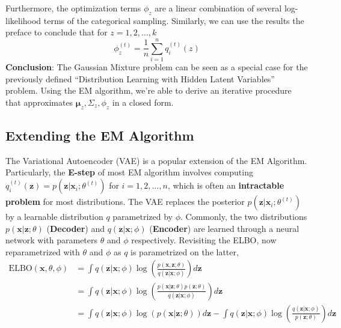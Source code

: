 Furthermore, the optimization terms $\phi_z$ are a linear combination of several log-likelihood terms of the categorical sampling. Similarly, we can use the results the preface to conclude that for $z=1,2,\dots,k$
\[
\phi_z^{(t)}  = \frac{1}{n} \sum_{i=1}^n q_i^{(t)}(z)
\]
\textbf{Conclusion}: The Gaussian Mixture problem can be seen as a special case for the previously defined ``Distribution Learning with Hidden Latent Variables'' problem. Using the EM algorithm, we're able to derive an iterative procedure that approximates $\boldsymbol{\mu}_z,\Sigma_z,\phi_z$ in a closed form.
\subsection{Extending the EM Algorithm}
The Variational Autoencoder (VAE) is a popular extension of the EM Algorithm. Particularly, the \textbf{E-step} of most EM algorithm involves computing $q_i^{(t)}(\mathbf{z})=p(\mathbf{z}|\mathbf{x}_i;\theta^{(t)})$ for $i=1,2,\dots,n$, which is often an \textbf{intractable problem} for most distributions. The VAE replaces the posterior $p(\mathbf{z}|\mathbf{x}_i;\theta^{(t)})$ by a learnable distribution $q$ parametrized by $\phi$. Commonly, the two distributions $p(\mathbf{x}|\mathbf{z};\theta)$ (\textbf{Decoder}) and $q(\mathbf{z}|\mathbf{x};\phi)$ (\textbf{Encoder}) are learned through a neural network with parameters $\theta$ and $\phi$ respectively. Revisiting the ELBO, now reparametrized with $\theta$ and $\phi$ as $q$ is parametrized on the latter,
\begin{align*}
    \text{ELBO}(\mathbf{x},\theta,\phi)
    &= \int q(\mathbf{z}|\mathbf{x};\phi) \log\left(\frac{p(\mathbf{x},\mathbf{z};\theta)}{q(\mathbf{z}|\mathbf{x};\phi)}\right) d\mathbf{z} \\
    &= \int q(\mathbf{z}|\mathbf{x};\phi) \log\left(\frac{p(\mathbf{x}|\mathbf{z};\theta)p(\mathbf{z};\theta)}{q(\mathbf{z}|\mathbf{x};\phi)}\right) d\mathbf{z} \\
    &= \int q(\mathbf{z}|\mathbf{x};\phi) \log(p(\mathbf{x}|\mathbf{z};\theta)) d\mathbf{z} - \int q(\mathbf{z}|\mathbf{x};\phi) \log\left(\frac{q(\mathbf{z}|\mathbf{x};\phi)}{p(\mathbf{z};\theta)}\right) d\mathbf{z}
\end{align*}
